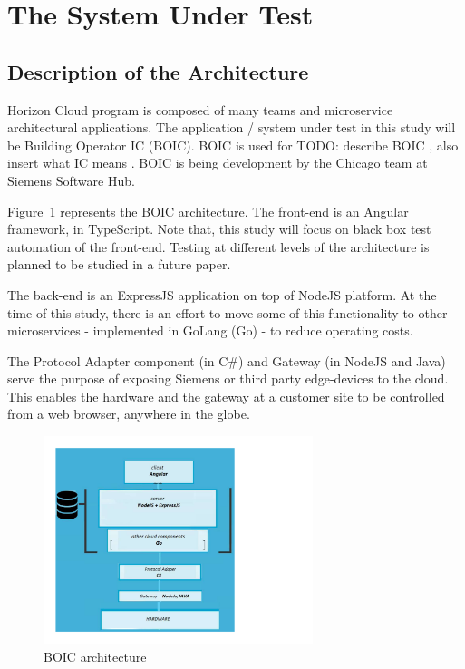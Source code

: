\documentclass[conference]{IEEEtran}
\newcommand{\todo}[1]{}
\renewcommand{\todo}[1]{{\color{red} TODO: {#1}}}
\begin{document}
\section{The System Under Test}

	\subsection{Description of the Architecture}
	
	Horizon Cloud program is composed of many teams and microservice architectural applications.
	The application / system under test in this study will be Building Operator IC (BOIC).
	BOIC is used for \todo {describe BOIC , also insert what IC means} . BOIC is being development by the Chicago team at Siemens Software Hub. 

	Figure~\ref{fig:BOIC architecture} represents the BOIC architecture.
	The front-end is an Angular framework, in TypeScript.
	Note that, this study will focus on black box test automation of the front-end. Testing at different levels of the architecture is planned to be studied in a future paper. 
	
	The back-end is an ExpressJS application on top of NodeJS platform. 
	At the time of this study, there is an effort to move some of this functionality to other microservices - implemented in GoLang (Go) - to reduce operating costs.
	
	The Protocol Adapter component (in C\#) and Gateway (in NodeJS and Java) serve the purpose of exposing Siemens or third party edge-devices to the cloud. 
	This enables the hardware and the gateway at a customer site to be controlled from a web browser, anywhere in the globe.

\begin{figure}[!h]
		\includegraphics[width=0.70\textwidth,]{architecture.pdf}
	\caption{BOIC architecture}
	\label{fig:BOIC architecture}
\end{figure}
\end{document}
